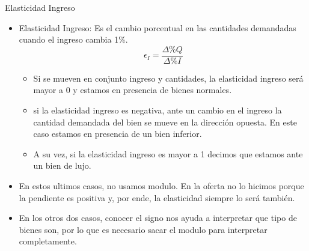 \documentclass{beamer}
\begin{document}
\begin{frame}{Elasticidad Ingreso}
  \begin{itemize}
    \item Elasticidad Ingreso: Es el cambio porcentual en las cantidades demandadas cuando el ingreso cambia 1\%.
    \begin{equation*}
      \epsilon_I = \frac{\Delta \% Q}{\Delta \% I}
    \end{equation*}    
    \begin{itemize}
        \item Si se mueven en conjunto ingreso y cantidades, la elasticidad ingreso será mayor a 0 y estamos en presencia de bienes normales.
        \item si la elasticidad ingreso es negativa, ante un cambio en el ingreso la cantidad demandada del bien se mueve en la dirección opuesta. En este caso estamos en presencia de un bien inferior.
        \item A su vez, si la elasticidad ingreso es mayor a 1 decimos que estamos ante un bien de lujo.
    \end{itemize}
    \item En estos ultimos casos, no usamos modulo. En la oferta no lo hicimos porque la pendiente es positiva y, por ende, la elasticidad siempre lo será también.
    \item En los otros dos casos, conocer el signo nos ayuda a interpretar que tipo de bienes son, por lo que es necesario sacar el modulo para interpretar completamente.
\end{itemize}
\end{frame}
\end{document}
